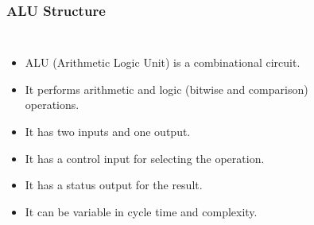 \begin{frame}
    \frametitle{ALU Structure}
    \begin{columns}
            \begin{itemize}
                \item ALU (Arithmetic Logic Unit) is a combinational circuit.
                \item It performs arithmetic and logic (bitwise and comparison) operations.
                \item It has two inputs and one output.
                \item It has a control input for selecting the operation.
                \item It has a status output for the result.
                \item It can be variable in cycle time and complexity.
            \end{itemize}

            \newsavebox{\asciialu}
            \begin{lrbox}{\asciialu}
                \begin{varwidth}{\maxdimen}
                \end{varwidth}
            \end{lrbox}%

            \begin{figure}[h]
                \centering
                \scalebox{0.7}{\usebox{\asciialu}}
            \end{figure}
    \end{columns}
    \note{
    }
\end{frame}
